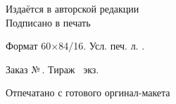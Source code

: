 \newpage
\thispagestyle{empty}
~\vfill
\begin{centering}
  \textit{\EdType}\\[18pt]
  \AuthorI\\[6pt]
  {\large\Title}\\[6pt]
  \PubType\\[18pt]
  Издаётся в авторской редакции\\
  \vspace{18pt}
  Подписано в печать \PUBDATE

  Формат 60×84/16. Усл. печ. л. \SHEETS.
  
  Заказ №\,\PUBORDER. Тираж \PUBCOUNT\ экз.

  \vspace{6pt}

  Отпечатано с готового оргинал-макета

  \PUBLISHER

  \PUBADDR
  
  \LICENSE
  
\end{centering}
\vspace{1cm}
